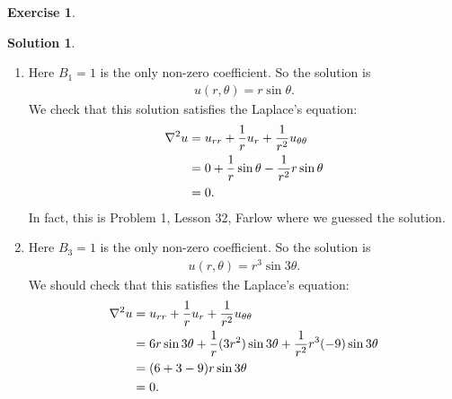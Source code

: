 \documentclass{book}
\theoremstyle{definition}
\newtheorem*{exer*}{Exercise}
\newtheorem*{sln*}{Solution}
\newcommand{\f}[2]{\frac{#1}{#2}}
\begin{document}
\begin{exer*}
\begin{sln*}
\begin{enumerate}
			
			\item Here $B_1 = 1$ is the only non-zero coefficient. So the solution is
			\begin{align*}
			u(r,\theta) = r\sin\theta.
			\end{align*}
			We check that this solution satisfies the Laplace's equation:
			\begin{align*}
				\laplacian u &= u_{rr} + \f{1}{r}u_r + \f{1}{r^2}u_{\theta\theta}\\
				&= 0 + \f{1}{r}\sin\theta - \f{1}{r^2}r\sin\theta\\
				&= 0.
			\end{align*}
			In fact, this is Problem 1, Lesson 32, Farlow where we guessed the solution. 
			
			
			\item Here $B_3 = 1$ is the only non-zero coefficient. So the solution is
			\begin{align*}
			u(r,\theta) = r^3\sin 3\theta.
			\end{align*}
			We should check that this satisfies the Laplace's equation:
			\begin{align*}
			\laplacian u &= u_{rr} + \f{1}{r}u_r + \f{1}{r^2}u_{\theta\theta}\\
			&= 6r\sin 3\theta + \f{1}{r}(3r^2)\sin 3\theta + \f{1}{r^2}r^3(-9)\sin 3\theta\\
			&= (6 + 3 - 9)r\sin3\theta\\
			&= 0.
			\end{align*}
		\end{enumerate}
		
	\end{sln*}
\end{exer*}




\newpage
\end{document}
